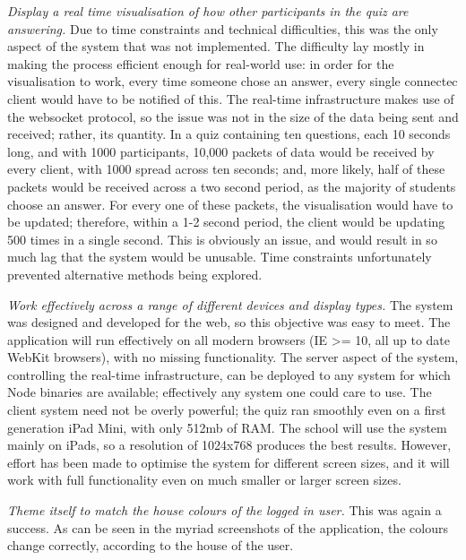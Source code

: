 \textit{Display a real time visualisation of how other participants in the quiz are answering.} Due to time constraints and technical difficulties, this was the only aspect of the system that was not implemented. The difficulty lay mostly in making the process efficient enough for real-world use: in order for the visualisation to work, every time someone chose an answer, every single connectec client would have to be notified of this. The real-time infrastructure makes use of the websocket protocol, so the issue was not in the size of the data being sent and received; rather, its quantity. In a quiz containing ten questions, each 10 seconds long, and with 1000 participants, 10,000 packets of data would be received by every client, with 1000 spread across ten seconds; and, more likely, half of these packets would be received across a two second period, as the majority of students choose an answer. For every one of these packets, the visualisation would have to be updated; therefore, within a 1-2 second period, the client would be updating 500 times in a single second. This is obviously an issue, and would result in so much lag that the system would be unusable. Time constraints unfortunately prevented alternative methods being explored.

\textit{Work effectively across a range of different devices and display types.} The system was designed and developed for the web, so this objective was easy to meet. The application will run effectively on all modern browsers (IE >= 10, all up to date WebKit browsers), with no missing functionality. The server aspect of the system, controlling the real-time infrastructure, can be deployed to any system for which Node binaries are available; effectively any system one could care to use. The client system need not be overly powerful; the quiz ran smoothly even on a first generation iPad Mini, with only 512mb of RAM. The school will use the system mainly on iPads, so a resolution of 1024x768 produces the best results. However, effort has been made to optimise the system for different screen sizes, and it will work with full functionality even on much smaller or larger screen sizes.

\textit{Theme itself to match the house colours of the logged in user.} This was again a success. As can be seen in the myriad screenshots of the application, the colours change correctly, according to the house of the user.
